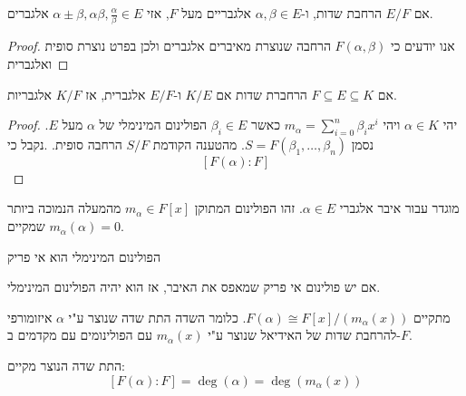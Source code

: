 \documentclass{tstextbook}
\begin{document}
\begin{proposition}
אם \(E / F\) הרחבת שדות, ו-\(\alpha,\beta \in E\) אלגבריים מעל \(F\), אזי \(\alpha\pm \beta,\alpha \beta,\frac{\alpha}{\beta}\in E\) אלגברים.

\end{proposition}
\begin{proof}
אנו יודעים כי \(F\left( \alpha,\beta \right)\) הרחבה שנוצרת מאיברים אלגברים ולכן בפרט נוצרת סופית ואלגברית

\end{proof}
\begin{proposition}
אם \(F\subseteq E \subseteq K\)  הרחברת שדות אם \(K / E\) ו-\(E / F\) אלגברית, אז \(K / F\) אלגבריות.

\end{proposition}
\begin{proof}
יהי \(\alpha \in K\) ויהי \(m_{\alpha}=\sum_{i=0}^{n} \beta_{i}x^{i}\) כאשר \(\beta_{i} \in E\) הפולינום המינימלי של \(\alpha\) מעל \(E\). נסמן \(S=F\left( \beta_{1},\dots,\beta_{n} \right)\). מהטענה הקודמת \(S / F\) הרחבה סופית. .נקבל כי
$$\left[ F\left( \alpha \right):F \right]$$

\end{proof}
\begin{definition}
מוגדר עבור איבר אלגברי \(\alpha \in E\). זהו הפולינום המתוקן \(m_{\alpha}\in F[x]\) מהמעלה הנמוכה ביותר שמקיים \(m_{\alpha}\left( \alpha \right)=0\).

\end{definition}
\begin{proposition}
הפולינום המינימלי הוא אי פריק

\end{proposition}
\begin{proposition}
אם יש פולינום אי פריק שמאפס את האיבר, אז הוא יהיה הפולינום המינימלי.

\end{proposition}
\begin{proposition}
מתקיים \(F\left( \alpha \right)\cong F[x] / \left( m_{\alpha}(x) \right)\). כלומר השדה התת שדה שנוצר ע"י \(\alpha\) איזומורפי להרחבת שדות של האידיאל שנוצר ע"י \(m_{\alpha}(x)\) עם הפולינומים עם מקדמים ב-\(F\).

\end{proposition}
\begin{proposition}
התת שדה הנוצר מקיים:
$$\left[ F\left( \alpha \right):F \right]=\deg\left( \alpha \right)=\deg\left( m_{\alpha}(x) \right)$$

\end{proposition}
\end{document}
